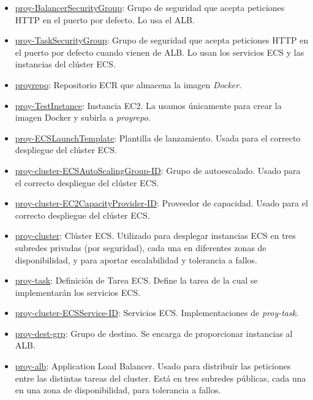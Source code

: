 \begin{itemize}
    \item \underline{proy-BalancerSecurityGroup}: Grupo de seguridad que acepta peticiones HTTP en el puerto por defecto. Lo usa el ALB.

    \item \underline{proy-TaskSecurityGroup}: Grupo de seguridad que acepta peticiones HTTP en el puerto por defecto cuando vienen de ALB. Lo usan los servicios ECS y las instancias del clúster ECS.

    \item \underline{proyrepo}: Repositorio ECR que almacena la imagen \textit{Docker}.

    \item \underline{proy-TestInstance}: Instancia EC2. La usamos únicamente para crear la imagen Docker y subirla a \textit{proyrepo}.

    \item \underline{proy-ECSLaunchTemplate}: Plantilla de lanzamiento. Usada para el correcto despliegue del clúster ECS.

    \item \underline{proy-cluster-ECSAutoScalingGroup-ID}: Grupo de autoescalado. Usado para el correcto despliegue del clúster ECS.

    \item \underline{proy-cluster-EC2CapacityProvider-ID}: Proveedor de capacidad. Usado para el correcto despliegue del clúster ECS.

    \item \underline{proy-cluster}: Clúster ECS. Utilizado para desplegar instancias ECS en tres subredes privadas (por seguridad), cada una en diferentes zonas de disponibilidad, y para aportar escalabilidad y tolerancia a fallos.

    \item \underline{proy-task}: Definición de Tarea ECS. Define la tarea de la cual se implementarán los servicios ECS.

    \item \underline{proy-cluster-ECSService-ID}: Servicios ECS. Implementaciones de \textit{proy-task}.

    \item \underline{proy-dest-grp}: Grupo de destino. Se encarga de proporcionar instancias al ALB.

    \item \underline{proy-alb}: Application Load Balancer. Usado para distribuir las peticiones entre las distintas tareas del cluster. Está en tres subredes públicas, cada una en una zona de disponibilidad, para tolerancia a fallos.


\end{itemize}
